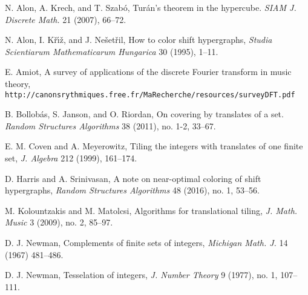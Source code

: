 \documentclass[12pt]{article}
\begin{document}
\begin{thebibliography}{99}
 N. Alon, A. Krech, and T. Szab\'o, Tur\'an's theorem in the hypercube. \textit{SIAM J. Discrete Math.} 21 (2007), 66--72.


 N. Alon, I. K{\v{r}}{\'\i}{\v{z}}, and J. Ne\v{s}et\v{r}il, How to color shift hypergraphs, \textit{Studia Scientiarum Mathematicarum Hungarica} 30 (1995), 1--11. 

 E. Amiot, A survey of applications of the discrete Fourier transform in music theory,\\ \texttt{http://canonsrythmiques.free.fr/MaRecherche/resources/surveyDFT.pdf}



 B. Bollob\'as, S. Janson, and O. Riordan, On covering by translates of a set. \textit{Random Structures Algorithms} 38 (2011), no. 1-2, 33--67. 

 E. M. Coven and A. Meyerowitz, Tiling the integers with translates of
one finite set, \textit{J. Algebra} 212 (1999), 161--174.

 D. Harris and A. Srinivasan, A note on near-optimal coloring of shift hypergraphs, \textit{Random Structures Algorithms} 48 (2016), no. 1, 53--56.

 M. Kolountzakis and M. Matolcsi, Algorithms for translational tiling, \textit{J. Math. Music} 3 (2009), no. 2, 85--97.

 D. J. Newman,  Complements of finite sets of integers, \textit{Michigan Math. J.} 14 (1967) 481--486. 

 D. J. Newman, Tesselation of integers, \textit{J. Number Theory} 9 (1977), no. 1, 107--111. 



\end{thebibliography}
\end{document}
